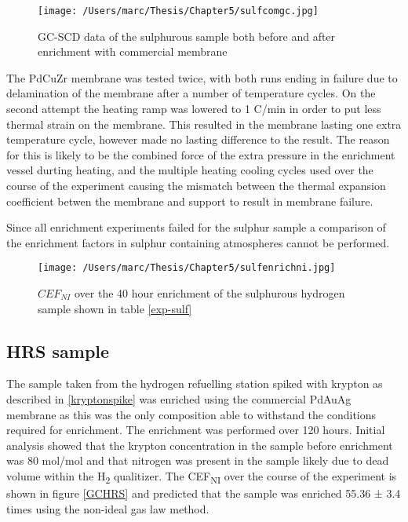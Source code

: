 \begin{figure}[H]
    \centering
    \texttt{[image: /Users/marc/Thesis/Chapter5/sulfcomgc.jpg]}
    \caption{GC-SCD data of the sulphurous sample both before and after enrichment with commercial membrane}
    \label{GCSULFCOMM}
\end{figure}

The PdCuZr membrane was tested twice, with both runs ending in failure due to delamination of the membrane after a number of temperature cycles. On the second attempt the heating ramp was lowered to 1 \textdegree C/min in order to put less thermal strain on the membrane. This resulted in the membrane lasting one extra temperature cycle, however made no lasting difference to the result. The reason for this is likely to be the combined force of the extra pressure in the enrichment vessel durting heating, and the multiple heating cooling cycles used over the course of the experiment causing the mismatch between the thermal expansion coefficient betwen the membrane and support to result in membrane failure. 

Since all enrichment experiments failed for the sulphur sample a comparison of the enrichment factors in sulphur containing atmospheres cannot be performed. 

\begin{landscape}
    \begin{figure}
        \centering
        \texttt{[image: /Users/marc/Thesis/Chapter5/sulfenrichni.jpg]}
        \caption{$CEF_{NI}$ over the 40 hour enrichment of the sulphurous hydrogen sample shown in table \ref{exp-sulf}}
        \label{GCSULF}
    \end{figure}
\end{landscape}

\subsection{HRS sample}
The sample taken from the hydrogen refuelling station spiked with krypton as described in \ref{kryptonspike} was enriched using the commercial PdAuAg membrane as this was the only composition able to withstand the conditions required for enrichment. The enrichment was performed over 120 hours. Initial analysis showed that the krypton concentration in the sample before enrichment was 80 \textmu mol/mol and that nitrogen was present in the sample likely due to dead volume within the H\textsubscript{2} qualitizer. The CEF\textsubscript{NI} over the course of the experiment is shown in figure \ref{GCHRS} and predicted that the sample was enriched 55.36 ± 3.4 times using the non-ideal gas law method.

